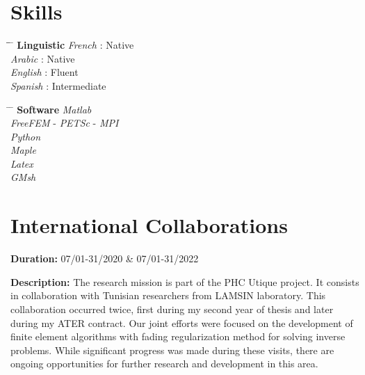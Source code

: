 \documentclass[10pt]{article} %
\begin{document}









\section{Skills}
\parbox{0.5\textwidth}{ %
	\begin{tabbing} %
		\hspace{2.5cm} \= \hspace{1.5cm}\= \hspace{4cm} \= \kill %
		{\bf Linguistic} \> \textit{French} \>:   Native\\ %
		\> 	\textit{Arabic} \>:  Native\\
		\> 	\textit{English} \>:  Fluent\\
		\> 	\textit{Spanish} \>:   Intermediate\\
\end{tabbing}}
\hspace{0.5cm}
\parbox{0.5\textwidth}{ %
	\begin{tabbing} %
		\hspace{3.5cm} \= \hspace{2cm} \= \kill %
		{\bf Software} 	\>  \textit{Matlab}\\
\> \textit{FreeFEM} - \textit{PETSc} - \textit{MPI}\\
\> \textit{Python}\\
\> \textit{Maple}\\
\> 	\textit{Latex}\\
\> 	\textit{GMsh} 
\end{tabbing}}


\section*{International Collaborations}

{
\textbf{Duration:} 07/01-31/2020 \& 07/01-31/2022

\textbf{Description:} The research mission is part of the PHC Utique project. It consists in collaboration with Tunisian researchers from LAMSIN laboratory. This collaboration occurred twice, first during my second year of thesis and later during my ATER contract. Our joint efforts were focused on the development of finite element algorithms with fading regularization method for solving inverse problems. While significant progress was made during these visits, there are ongoing opportunities for further research and development in this area.
}
\newpage
\end{document}
